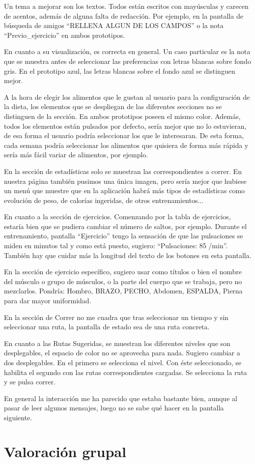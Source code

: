 \documentclass[a4paper]{article}
\begin{document}
Un tema a mejorar son los textos. Todos están escritos con mayúsculas y carecen de acentos, además de alguna falta de redacción. Por ejemplo, en la pantalla de búsqueda de amigos ``RELLENA ALGUN DE LOS CAMPOS'' o la nota ``Previo\_ejercicio'' en ambos prototipos.

En cuanto a su visualización, es correcta en general. Un caso particular es la nota que se muestra antes de seleccionar las preferencias con letras blancas sobre fondo gris. En el prototipo azul, las letras blancas sobre el fondo azul se distinguen mejor.

A la hora de elegir los alimentos que le gustan al usuario para la configuración de la dieta, los elementos que se despliegan de las diferentes secciones no se distinguen de la sección. En ambos prototipos poseen el mismo color. Además, todos los elementos están pulsados por defecto, sería mejor que no lo estuvieran, de esa forma el usuario podría seleccionar los que le interesaran. De esta forma, cada semana podría seleccionar los alimentos que quisiera de forma más rápida y sería más fácil variar de alimentos, por ejemplo.

En la sección de estadísticas solo se muestran las correspondientes a correr. En nuestra página también pusimos una única imagen, pero sería mejor que hubiese un menú que muestre que en la aplicación habrá más tipos de estadísticas como evolución de peso, de calorías ingeridas, de otros entrenamientos...

En cuanto a la sección de ejercicios. Comenzando por la tabla de ejercicios, estaría bien que se pudiera cambiar el número de saltos, por ejemplo. Durante el entrenamiento, pantalla ``Ejercicio'' tengo la sensación de que las pulsaciones se miden en minutos tal y como está puesto, sugiero: ``Pulsaciones: 85 /min''. También hay que cuidar más la longitud del texto de los botones en esta pantalla.

En la sección de ejercicio específico, sugiero usar como títulos o bien el nombre del músculo o grupo de músculos, o la parte del cuerpo que se trabaja, pero no mezclarlos. Pondría: Hombro, BRAZO, PECHO, Abdomen, ESPALDA, Pierna para dar mayor uniformidad.

En la sección de Correr no me cuadra que tras seleccionar un tiempo y sin seleccionar una ruta, la pantalla de estado sea de una ruta concreta.

En cuanto a las Rutas Sugeridas, se muestran los diferentes niveles que son desplegables, el espacio de color no se aprovecha para nada. Sugiero cambiar a dos desplegables. En el primero se selecciona el nivel. Con éste seleccionado, se habilita el segundo con las rutas correspondientes cargadas. Se selecciona la ruta y se pulsa correr.

En general la interacción me ha parecido que estaba bastante bien, aunque al pasar de leer algunos mensajes, luego no se sabe qué hacer en la pantalla siguiente.

\section{Valoración grupal}
 
\end{document}
